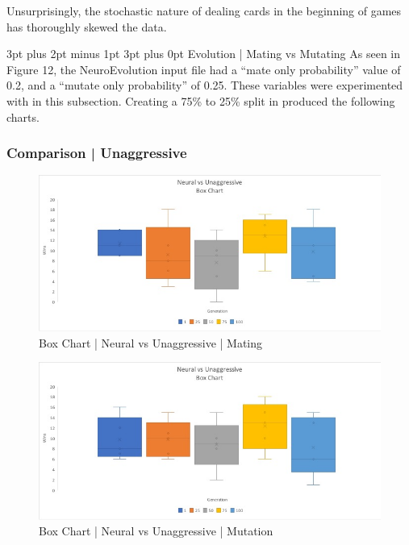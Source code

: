 \documentclass[12pt,a4paper]{article}
\makeatletter
\renewcommand\subsection{\@startsection {subsection}{1}{2mm} %
                               {3pt plus 2pt minus 1pt} %
                               {3pt plus 0pt} %
                               {\normalfont\bfseries}}
\makeatother
\begin{document}
Unsurprisingly, the stochastic nature of dealing cards in the beginning of games has thoroughly skewed the data.

\newpage
\subsection{Evolution | Mating vs Mutating}
As seen in Figure 12, the NeuroEvolution input file had a \enquote{mate only probability} value of 0.2, and a \enquote{mutate only probability} of 0.25. These variables were experimented with in this subsection. Creating a 75\% to 25\% split in produced the following charts.  
\subsubsection{Comparison | Unaggressive}

\begin{figure}[h]
	\centering
	\includegraphics[width = \textwidth]{BoxUna2.jpg}
	\caption{Box Chart | Neural vs Unaggressive | Mating }
\end{figure}

\begin{figure}[h]
	\centering
	\includegraphics[width = \textwidth]{BoxUna3.jpg}
	\caption{Box Chart | Neural vs Unaggressive | Mutation}
\end{figure}
\end{document}
